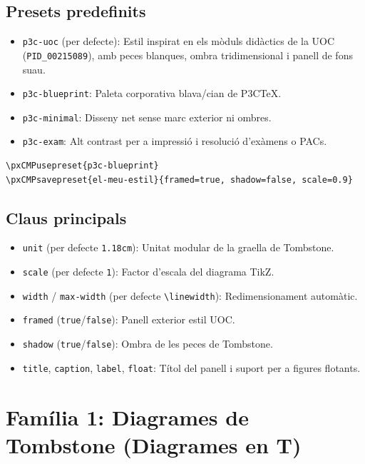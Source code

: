 \documentclass[11pt,a4paper]{article}
\begin{document}
\subsection{Presets predefinits}
\begin{itemize}
  \item \texttt{p3c-uoc} (per defecte): Estil inspirat en els m\`oduls did\`actics de la UOC
    (\texttt{PID\_00215089}), amb peces blanques, ombra tridimensional i panell de fons suau.
  \item \texttt{p3c-blueprint}: Paleta corporativa blava/cian de P3CTeX.
  \item \texttt{p3c-minimal}: Disseny net sense marc exterior ni ombres.
  \item \texttt{p3c-exam}: Alt contrast per a impressi\'o i resoluci\'o d'ex\`amens o PACs.
\end{itemize}

\begin{verbatim}
\pxCMPusepreset{p3c-blueprint}
\pxCMPsavepreset{el-meu-estil}{framed=true, shadow=false, scale=0.9}
\end{verbatim}

\subsection{Claus principals}
\begin{itemize}
  \item \texttt{unit} (per defecte \texttt{1.18cm}): Unitat modular de la graella de Tombstone.
  \item \texttt{scale} (per defecte \texttt{1}): Factor d'escala del diagrama TikZ.
  \item \texttt{width} / \texttt{max-width} (per defecte \texttt{\textbackslash linewidth}): Redimensionament autom\`atic.
  \item \texttt{framed} (\texttt{true}/\texttt{false}): Panell exterior estil UOC.
  \item \texttt{shadow} (\texttt{true}/\texttt{false}): Ombra de les peces de Tombstone.
  \item \texttt{title}, \texttt{caption}, \texttt{label}, \texttt{float}: T\'itol del panell i suport per a figures flotants.
\end{itemize}

\newpage
\section{Fam\'ilia 1: Diagrames de Tombstone (Diagrames en T)}
\end{document}
